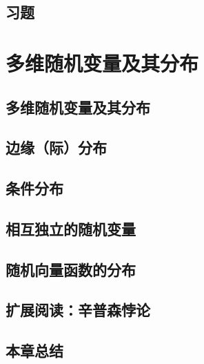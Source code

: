 \documentclass[UTF8,12pt,a4paper,fontset=fandol]{ctexbook}
\begin{document}
\section*{习题}

\chapter{多维随机变量及其分布}
\label{chap:study-multivariate}

\section{多维随机变量及其分布}
\label{sec:study-joint-distributions}

\section{边缘（际）分布}
\label{sec:study-marginal-distributions}

\section{条件分布}
\label{sec:study-conditional-distributions}

\section{相互独立的随机变量}
\label{sec:study-independent-variables}

\section{随机向量函数的分布}
\label{sec:study-vector-transformations}

\section{扩展阅读：辛普森悖论}
\label{sec:study-simpson-paradox}

\section*{本章总结}
\end{document}
